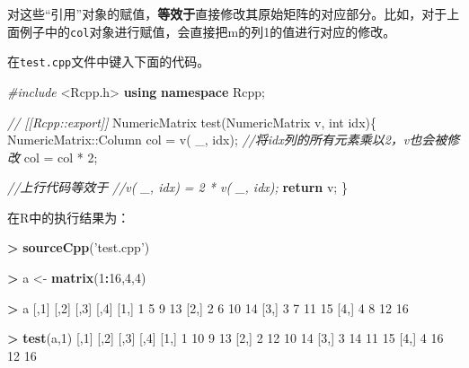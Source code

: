 \documentclass[]{ctexbook}
\newenvironment{Shaded}{\begin{snugshade}}{\end{snugshade}}
\newcommand{\KeywordTok}[1]{\textcolor[rgb]{0.13,0.29,0.53}{\textbf{#1}}}
\newcommand{\DataTypeTok}[1]{\textcolor[rgb]{0.13,0.29,0.53}{#1}}
\newcommand{\DecValTok}[1]{\textcolor[rgb]{0.00,0.00,0.81}{#1}}
\newcommand{\StringTok}[1]{\textcolor[rgb]{0.31,0.60,0.02}{#1}}
\newcommand{\ImportTok}[1]{#1}
\newcommand{\CommentTok}[1]{\textcolor[rgb]{0.56,0.35,0.01}{\textit{#1}}}
\newcommand{\ControlFlowTok}[1]{\textcolor[rgb]{0.13,0.29,0.53}{\textbf{#1}}}
\newcommand{\OperatorTok}[1]{\textcolor[rgb]{0.81,0.36,0.00}{\textbf{#1}}}
\newcommand{\PreprocessorTok}[1]{\textcolor[rgb]{0.56,0.35,0.01}{\textit{#1}}}
\newcommand{\NormalTok}[1]{#1}
\begin{document}
对这些``引用''对象的赋值，\textbf{等效于}直接修改其原始矩阵的对应部分。比如，对于上面例子中的\texttt{col}对象进行赋值，会直接把m的列1的值进行对应的修改。

在\texttt{test.cpp}文件中键入下面的代码。

\begin{Shaded}
\begin{Highlighting}[]
\PreprocessorTok{#include }\ImportTok{<Rcpp.h>}
\KeywordTok{using} \KeywordTok{namespace}\NormalTok{ Rcpp;}

\CommentTok{// [[Rcpp::export]]}
\NormalTok{NumericMatrix test(NumericMatrix v, }\DataTypeTok{int}\NormalTok{ idx)\{}
\NormalTok{    NumericMatrix::Column col = v( _, idx);}
    \CommentTok{//将idx列的所有元素乘以2，v也会被修改}
\NormalTok{    col = col * }\DecValTok{2}\NormalTok{; }
    
    \CommentTok{//上行代码等效于}
    \CommentTok{//v( _, idx) = 2 * v( _, idx);}
    \ControlFlowTok{return}\NormalTok{ v;}
\NormalTok{\}}
\end{Highlighting}
\end{Shaded}

在R中的执行结果为：

\begin{Shaded}
\begin{Highlighting}[]
\OperatorTok{>}\StringTok{ }\KeywordTok{sourceCpp}\NormalTok{(}\StringTok{'test.cpp'}\NormalTok{)}

\OperatorTok{>}\StringTok{ }\NormalTok{a <-}\StringTok{ }\KeywordTok{matrix}\NormalTok{(}\DecValTok{1}\OperatorTok{:}\DecValTok{16}\NormalTok{,}\DecValTok{4}\NormalTok{,}\DecValTok{4}\NormalTok{)}

\OperatorTok{>}\StringTok{ }\NormalTok{a}
\NormalTok{     [,}\DecValTok{1}\NormalTok{] [,}\DecValTok{2}\NormalTok{] [,}\DecValTok{3}\NormalTok{] [,}\DecValTok{4}\NormalTok{]}
\NormalTok{[}\DecValTok{1}\NormalTok{,]    }\DecValTok{1}    \DecValTok{5}    \DecValTok{9}   \DecValTok{13}
\NormalTok{[}\DecValTok{2}\NormalTok{,]    }\DecValTok{2}    \DecValTok{6}   \DecValTok{10}   \DecValTok{14}
\NormalTok{[}\DecValTok{3}\NormalTok{,]    }\DecValTok{3}    \DecValTok{7}   \DecValTok{11}   \DecValTok{15}
\NormalTok{[}\DecValTok{4}\NormalTok{,]    }\DecValTok{4}    \DecValTok{8}   \DecValTok{12}   \DecValTok{16}

\OperatorTok{>}\StringTok{ }\KeywordTok{test}\NormalTok{(a,}\DecValTok{1}\NormalTok{)}
\NormalTok{     [,}\DecValTok{1}\NormalTok{] [,}\DecValTok{2}\NormalTok{] [,}\DecValTok{3}\NormalTok{] [,}\DecValTok{4}\NormalTok{]}
\NormalTok{[}\DecValTok{1}\NormalTok{,]    }\DecValTok{1}   \DecValTok{10}    \DecValTok{9}   \DecValTok{13}
\NormalTok{[}\DecValTok{2}\NormalTok{,]    }\DecValTok{2}   \DecValTok{12}   \DecValTok{10}   \DecValTok{14}
\NormalTok{[}\DecValTok{3}\NormalTok{,]    }\DecValTok{3}   \DecValTok{14}   \DecValTok{11}   \DecValTok{15}
\NormalTok{[}\DecValTok{4}\NormalTok{,]    }\DecValTok{4}   \DecValTok{16}   \DecValTok{12}   \DecValTok{16}
\end{Highlighting}
\end{Shaded}
\end{document}
